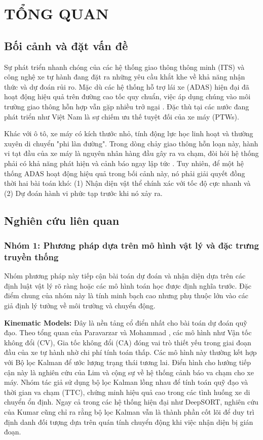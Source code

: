 \chapter{TỔNG QUAN}
	\section{Bối cảnh và đặt vấn đề}
	Sự phát triển nhanh chóng của các hệ thống giao thông thông minh (ITS) và công nghệ xe tự hành đang đặt ra những yêu cầu khắt khe về khả năng nhận thức và dự đoán rủi ro. Mặc dù các hệ thống hỗ trợ lái xe (ADAS) hiện đại đã hoạt động hiệu quả trên đường cao tốc quy chuẩn, việc áp dụng chúng vào môi trường giao thông hỗn hợp vẫn gặp nhiều trở ngại \cite{Lefvre2014ASO}. Đặc thù tại các nước đang phát triển như Việt Nam là sự chiếm ưu thế tuyệt đối của xe máy (PTWs).
	
	Khác với ô tô, xe máy có kích thước nhỏ, tính động lực học linh hoạt và thường xuyên di chuyển "phi làn đường". Trong dòng chảy giao thông hỗn loạn này, hành vi tạt đầu của xe máy là nguyên nhân hàng đầu gây ra va chạm, đòi hỏi hệ thống phải có khả năng phát hiện và cảnh báo ngay lập tức \cite{Zeng2025TrajectoryPF}. Tuy nhiên, để một hệ thống ADAS hoạt động hiệu quả trong bối cảnh này, nó phải giải quyết đồng thời hai bài toán khó: (1) Nhận diện vật thể chính xác với tốc độ cực nhanh và (2) Dự đoán hành vi phức tạp trước khi nó xảy ra.
	\section{Nghiên cứu liên quan}
	\subsection{Nhóm 1: Phương pháp dựa trên mô hình vật lý và đặc trưng truyền thống}

	Nhóm phương pháp này tiếp cận bài toán dự đoán và nhận diện dựa trên các định luật vật lý rõ ràng hoặc các mô hình toán học được định nghĩa trước. Đặc điểm chung của nhóm này là tính minh bạch cao nhưng phụ thuộc lớn vào các giả định lý tưởng về môi trường và chuyển động.

	\textbf{Kinematic Models:}
	Đây là nền tảng cổ điển nhất cho bài toán dự đoán quỹ đạo. Theo tổng quan của Paravarzar và Mohammad \cite{Paravarzar2020}, các mô hình như Vận tốc không đổi (CV), Gia tốc không đổi (CA) đóng vai trò thiết yếu trong giai đoạn đầu của xe tự hành nhờ chi phí tính toán thấp. Các mô hình này thường kết hợp với Bộ lọc Kalman để ước lượng trạng thái tương lai.
	Điển hình cho hướng tiếp cận này là nghiên cứu của Lim và cộng sự \cite{Lim2018} về hệ thống cảnh báo va chạm cho xe máy. Nhóm tác giả sử dụng bộ lọc Kalman lồng nhau để tính toán quỹ đạo và thời gian va chạm (TTC), chứng minh hiệu quả cao trong các tình huống xe di chuyển ổn định. Ngay cả trong các hệ thống hiện đại như DeepSORT, nghiên cứu của Kumar \cite{Kumar2023} cũng chỉ ra rằng bộ lọc Kalman vẫn là thành phần cốt lõi để duy trì định danh đối tượng dựa trên quán tính chuyển động khi việc nhận diện bị gián đoạn.


